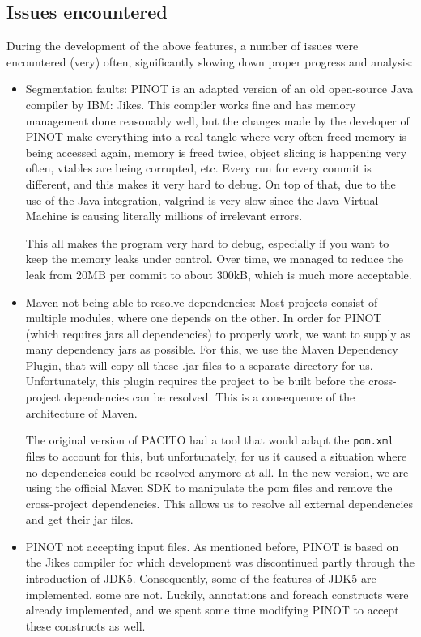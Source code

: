 \subsection{Issues encountered}
During the development of the above features, a number of issues were encountered (very) often, significantly slowing down proper progress and analysis:
\begin{itemize}
    \item Segmentation faults: PINOT is an adapted version of an old open-source Java compiler by IBM: Jikes. This compiler works fine and has memory management done reasonably well, but the changes made by the developer of PINOT make everything into a real tangle where very often freed memory is being accessed again, memory is freed twice, object slicing is happening very often, vtables are being corrupted, etc. Every run for every commit is different, and this makes it very hard to debug. On top of that, due to the use of the Java integration, valgrind is very slow since the Java Virtual Machine is causing literally millions of irrelevant errors.
    
    This all makes the program very hard to debug, especially if you want to keep the memory leaks under control. Over time, we managed to reduce the leak from 20MB per commit to about 300kB, which is much more acceptable.
    
    \item Maven not being able to resolve dependencies: Most projects consist of multiple modules, where one depends on the other. In order for PINOT (which requires jars all dependencies) to properly work, we want to supply as many dependency jars as possible. For this, we use the Maven Dependency Plugin, that will copy all these .jar files to a separate directory for us. Unfortunately, this plugin requires the project to be built before the cross-project dependencies can be resolved. This is a consequence of the architecture of Maven.
    
    The original version of PACITO had a tool that would adapt the {\tt pom.xml} files to account for this, but unfortunately, for us it caused a situation where no dependencies could be resolved anymore at all. In the new version, we are using the official Maven SDK to manipulate the pom files and remove the cross-project dependencies. This allows us to resolve all external dependencies and get their jar files.
    
    \item PINOT not accepting input files. As mentioned before, PINOT is based on the Jikes compiler for which development was discontinued partly through the introduction of JDK5. Consequently, some of the features of JDK5 are implemented, some are not. Luckily, annotations and foreach constructs were already implemented, and we spent some time modifying PINOT to accept these constructs as well.
    

\end{itemize}
